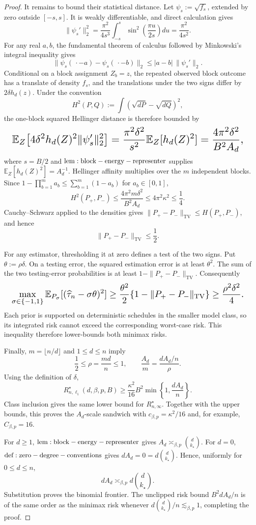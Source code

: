 \documentclass{article}
\begin{document}
\begin{proof}
It remains to bound their statistical distance. Let \(\psi_s:=\sqrt{f_s}\), extended by zero outside \([-s,s]\). It is weakly differentiable, and direct calculation gives
\[
\|\psi_s'\|_2^2
=\frac{\pi^2}{4s^3}\int_{-s}^{s}
\sin^2\!\left(\frac{\pi u}{2s}\right)du
=\frac{\pi^2}{4s^2}.
\]
For any real \(a,b\), the fundamental theorem of calculus followed by Minkowski's integral inequality gives
\[
\|\psi_s(\,\cdot-a)-\psi_s(\,\cdot-b)\|_2
\le |a-b|\,\|\psi_s'\|_2.
\]
Conditional on a block assignment \(Z_b=z\), the repeated observed block outcome has a translate of density \(f_s\), and the translations under the two signs differ by \(2\delta h_d(z)\). Under the convention
\[
H^2(P,Q):=\int(\sqrt{dP}-\sqrt{dQ})^2,
\]
the one-block squared Hellinger distance is therefore bounded by
\[
\makebox[\linewidth][c]{\resizebox{0.98\linewidth}{!}{\(\displaystyle \mathbb E_Z\!\left[4\delta^2h_d(Z)^2\|\psi_s'\|_2^2\right]
=\frac{\pi^2\delta^2}{s^2}\mathbb E_Z[h_d(Z)^2]
=\frac{4\pi^2\delta^2}{B^2A_d},\)}}
\]
where \(s=B/2\) and \({\rm lem:block-energy-representer}\) supplies \(\mathbb E_Z[h_d(Z)^2]=A_d^{-1}\). Hellinger affinity multiplies over the \(m\) independent blocks. Since \(1-\prod_{b=1}^m a_b\le\sum_{b=1}^m(1-a_b)\) for \(a_b\in[0,1]\),
\[
H^2(P_+,P_-)
\le\frac{4\pi^2m\delta^2}{B^2A_d}
\le4\pi^2\kappa^2
\le\frac14.
\]
Cauchy--Schwarz applied to the densities gives \(\|P_+-P_-\|_{\mathrm{TV}}\le H(P_+,P_-)\), and hence
\[
\|P_+-P_-\|_{\mathrm{TV}}\le\frac12.
\]

For any estimator, thresholding it at zero defines a test of the two signs. Put \(\theta:=\rho\delta\). On a testing error, the squared estimation error is at least \(\theta^2\). The sum of the two testing-error probabilities is at least \(1-\|P_+-P_-\|_{\mathrm{TV}}\). Consequently
\[
\makebox[\linewidth][c]{\resizebox{0.98\linewidth}{!}{\(\displaystyle \max_{\sigma\in\{-1,1\}}
\mathbb E_{P_\sigma}[(\widehat\tau_n-\sigma\theta)^2]
\ge\frac{\theta^2}{2}
\{1-\|P_+-P_-\|_{\mathrm{TV}}\}
\ge\frac{\rho^2\delta^2}{4}.\)}}
\]
Each prior is supported on deterministic schedules in the smaller model class, so its integrated risk cannot exceed the corresponding worst-case risk. This inequality therefore lower-bounds both minimax risks.

Finally, \(m=\lfloor n/d\rfloor\) and \(1\le d\le n\) imply
\[
\frac12\le\rho=\frac{md}{n}\le1,
\qquad
\frac{A_d}{m}=\frac{dA_d/n}{\rho}.
\]
Using the definition of \(\delta\),
\[
R_{n,\ell_1}^{\star}(d,\beta,p,B)
\ge\frac{\kappa^2}{16}B^2
\min\!\left\{1,\frac{dA_d}{n}\right\}.
\]
Class inclusion gives the same lower bound for \(R_{n,\infty}^{\star}\). Together with the upper bounds, this proves the \(A_d\)-scale sandwich with \(c_{\beta,p}=\kappa^2/16\) and, for example, \(C_{\beta,p}=16\).

For \(d\ge1\), \({\rm lem:block-energy-representer}\) gives \(A_d\asymp_{\beta,p}\binom d{k_\star}\). For \(d=0\), \({\rm def:zero-degree-conventions}\) gives \(dA_d=0=d\binom d{k_\star}\). Hence, uniformly for \(0\le d\le n\),
\[
dA_d\asymp_{\beta,p}d\binom d{k_\star}.
\]
Substitution proves the binomial frontier. The unclipped risk bound \(B^2dA_d/n\) is of the same order as the minimax risk whenever \(d\binom d{k_\star}/n\lesssim_{\beta,p}1\), completing the proof.
\end{proof}
\end{document}
